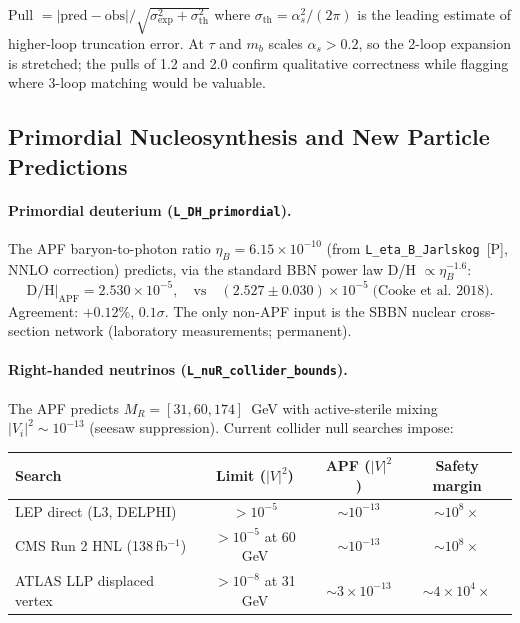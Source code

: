 \documentclass[11pt]{article}
\begin{document}
\noindent Pull $= |\text{pred}-\text{obs}|/\sqrt{\sigma_{\mathrm{exp}}^2+\sigma_{\mathrm{th}}^2}$ where $\sigma_{\mathrm{th}} = \alpha_s^2/(2\pi)$ is the leading estimate of higher-loop truncation error.  At $\tau$ and $m_b$ scales $\alpha_s > 0.2$, so the 2-loop expansion is stretched; the pulls of 1.2 and 2.0 confirm qualitative correctness while flagging where 3-loop matching would be valuable.


\subsection{Primordial Nucleosynthesis and New Particle Predictions}

\paragraph{Primordial deuterium (\texttt{L\_DH\_primordial}).}
The APF baryon-to-photon ratio $\eta_B = 6.15\times10^{-10}$ (from \texttt{L\_eta\_B\_Jarlskog}~[P], NNLO correction) predicts, via the standard BBN power law D/H $\propto \eta_B^{-1.6}$:
\[
\mathrm{D/H}|_{\mathrm{APF}} = 2.530\times10^{-5},
\quad\text{vs}\quad
(2.527\pm0.030)\times10^{-5}\;\text{(Cooke et al.\ 2018)}.
\]
Agreement: $+0.12\%$, $0.1\sigma$.  The only non-APF input is the SBBN nuclear cross-section network (laboratory measurements; permanent).

\paragraph{Right-handed neutrinos (\texttt{L\_nuR\_collider\_bounds}).}
The APF predicts $M_R = [31, 60, 174]$~GeV with active-sterile mixing $|V_i|^2 \sim 10^{-13}$ (seesaw suppression).  Current collider null searches impose:

\begin{center}\small
\begin{tabular}{lccc}
\toprule
Search & Limit ($|V|^2$) & APF ($|V|^2$) & Safety margin \\
\midrule
LEP direct (L3, DELPHI) & $>10^{-5}$ & $\sim 10^{-13}$ & $\sim 10^8\times$ \\
CMS Run 2 HNL (138\,fb$^{-1}$) & $>10^{-5}$ at 60 GeV & $\sim 10^{-13}$ & $\sim 10^8\times$ \\
ATLAS LLP displaced vertex & $>10^{-8}$ at 31 GeV & $\sim 3\times10^{-13}$ & $\sim 4\times10^4\times$ \\
\bottomrule
\end{tabular}
\end{center}
\end{document}
